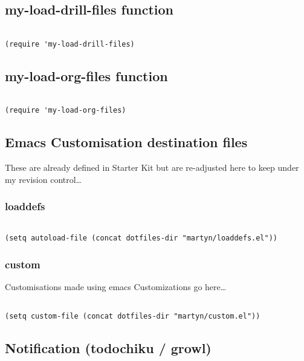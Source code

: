 \documentclass[colorlinks=true,urlcolor=blue,listings-sv]{article}
\begin{document}
\subsection{my-load-drill-files function}
\label{sec-1-20}



\lstset{language=Lisp}
\begin{lstlisting}

(require 'my-load-drill-files)
\end{lstlisting}
\subsection{my-load-org-files function}
\label{sec-1-21}



\lstset{language=Lisp}
\begin{lstlisting}

(require 'my-load-org-files)
\end{lstlisting}
\subsection{Emacs Customisation destination files}
\label{sec-1-22}


These are already defined in Starter Kit but are re-adjusted here to keep
under my revision control\ldots{}
\subsubsection{loaddefs}
\label{sec-1-22-1}



\lstset{language=Lisp}
\begin{lstlisting}

(setq autoload-file (concat dotfiles-dir "martyn/loaddefs.el"))
\end{lstlisting}
\subsubsection{custom}
\label{sec-1-22-2}


Customisations made using emacs Customizations go here\ldots{}


\lstset{language=Lisp}
\begin{lstlisting}

(setq custom-file (concat dotfiles-dir "martyn/custom.el"))
\end{lstlisting}
\subsection{Notification (todochiku / growl)}
\label{sec-1-23}
\end{document}
